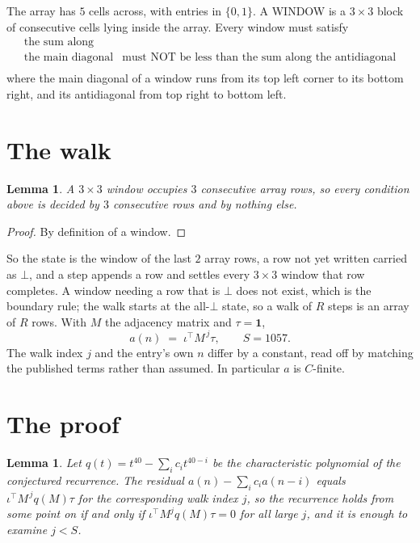 \documentclass[11pt,a4paper]{article}
\theoremstyle{plain}
\newtheorem{lemma}[theorem]{Lemma}
\theoremstyle{definition}
\begin{document}
The array has $5$ cells across, with entries in $\{0,1\}$. A WINDOW is a $3\times3$ block
of consecutive cells lying inside the array. Every window must satisfy
\[
\begin{array}{ll}
\text{the sum along} & \text{} \\[2pt]
\text{the main diagonal} & \text{must NOT be less than the sum along the antidiagonal} \\
\end{array}
\]
where the main diagonal of a window runs from its top left corner to its bottom right, and its
antidiagonal from top right to bottom left.

\section{The walk}

\begin{lemma}\label{lem:win}
A $3\times3$ window occupies $3$ consecutive array rows, so every condition above is
decided by $3$ consecutive rows and by nothing else.
\end{lemma}

\begin{proof}
By definition of a window.
\end{proof}

So the state is the window of the last $2$ array rows, a row not yet written carried as
$\bot$, and a step appends a row and settles every $3\times3$ window that row completes. A
window needing a row that is $\bot$ does not exist, which is the boundary rule; the walk starts
at the all-$\bot$ state, so a walk of $R$ steps is an array of $R$ rows. With $M$ the adjacency
matrix and $\tau=\mathbf{1}$,
\[
a(n)\;=\;\iota^{\!\top}M^{\,j}\tau ,\qquad S=1057.
\]
The walk index $j$ and the entry's own $n$ differ by a constant, read off by matching the
published terms rather than assumed. In particular $a$ is $C$-finite.

\section{The proof}

\begin{lemma}\label{lem:crit}
Let $q(t)=t^{40}-\sum_i c_it^{40-i}$ be the characteristic polynomial of the
conjectured recurrence. The residual $a(n)-\sum_ic_ia(n-i)$ equals
$\iota^{\!\top}M^{\,j}q(M)\tau$ for the corresponding walk index $j$, so the recurrence
holds from some point on if and only if $\iota^{\!\top}M^{j}q(M)\tau=0$ for all large $j$,
and it is enough to examine $j<S$.
\end{lemma}
\end{document}

